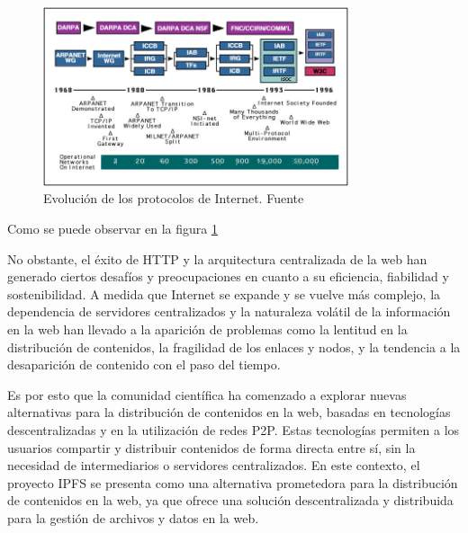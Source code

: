 \begin{figure}
      \centering
      \includegraphics[width=0.8\textwidth]{images/TimelineOfTheInternetProtocols.png}
      \caption[Evolución de los protocolos de Internet]{Evolución de los protocolos de Internet. Fuente \cite{leinerBriefHistoryInternet1999}}
      \label{fig:evolucion-protocolos}
\end{figure}

Como se puede observar en la figura \ref{fig:evolucion-protocolos}

No obstante, el éxito de HTTP y la arquitectura centralizada de la web han generado ciertos desafíos y preocupaciones en cuanto a su eficiencia, fiabilidad y sostenibilidad. A medida que Internet se expande y se vuelve más complejo, la dependencia de servidores centralizados y la naturaleza volátil de la información en la web han llevado a la aparición de problemas como la lentitud en la distribución de contenidos, la fragilidad de los enlaces y nodos, y la tendencia a la desaparición de contenido con el paso del tiempo.


Es por esto que la comunidad científica ha comenzado a explorar nuevas alternativas para la distribución de contenidos en la web, basadas en tecnologías descentralizadas y en la utilización de redes P2P. Estas tecnologías permiten a los usuarios compartir y distribuir contenidos de forma directa entre sí, sin la necesidad de intermediarios o servidores centralizados. En este contexto, el proyecto IPFS se presenta como una alternativa prometedora para la distribución de contenidos en la web, ya que ofrece una solución descentralizada y distribuida para la gestión de archivos y datos en la web.


